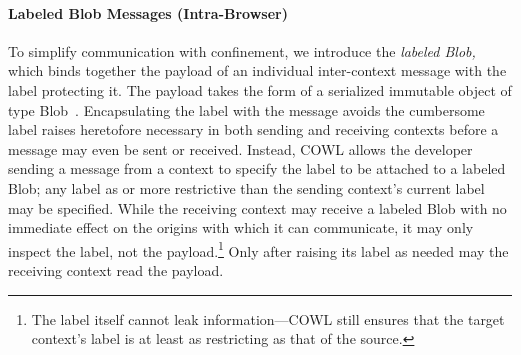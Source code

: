 \paragraph{Labeled Blob Messages (Intra-Browser)}
To simplify communication with confinement, we introduce the {\em
  labeled Blob,} which binds together the payload of an individual
inter-context message with the label protecting it. The payload takes
the form of a serialized immutable object of type Blob~\cite{html5}.
Encapsulating the label with the message avoids the cumbersome label
raises heretofore necessary in both sending and receiving contexts
before a message may even be sent or received. Instead, COWL allows
the developer sending a message from a context to specify the label to
be attached to a labeled Blob; any label as or more restrictive than the
sending context's current label may be specified. While the receiving
context may receive a labeled Blob with no immediate effect on the
origins with which it can communicate, it may only inspect the label,
not the payload.\footnote{The label itself cannot leak
information---COWL still ensures that the target context's label is at
least as restricting as that of the source.}
Only after raising its label as needed may the receiving context read
the payload.
%
%
%
%

